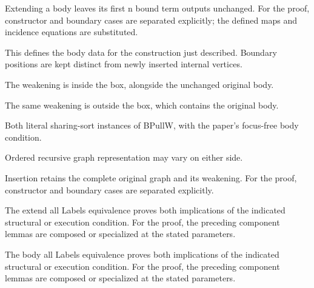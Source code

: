 Extending a body leaves its first n bound term outputs unchanged.
For the proof, constructor and boundary cases are separated explicitly; the defined maps and incidence equations are substituted.
\par{}

This defines the body data for the construction just described. Boundary positions are kept distinct from newly inserted internal vertices.
\par{}

The weakening is inside the box, alongside the unchanged original body.
\par{}

The same weakening is outside the box, which contains the original body.
\par{}

Both literal sharing-sort instances of BPullW, with the paper's focus-free body condition.
\par{}

Ordered recursive graph representation may vary on either side.
\par{}

Insertion retains the complete original graph and its weakening.
For the proof, constructor and boundary cases are separated explicitly.
\par{}

The extend all Labels equivalence proves both implications of the indicated structural or execution condition.
For the proof, the preceding component lemmas are composed or specialized at the stated parameters.
\par{}

The body all Labels equivalence proves both implications of the indicated structural or execution condition.
For the proof, the preceding component lemmas are composed or specialized at the stated parameters.
\par{}

